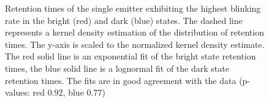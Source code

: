 	\begin{figure}[tp]
		\centering
		\caption{Retention times of the single emitter exhibiting the highest blinking rate in the bright (red) and dark (blue) states. The dashed line represents a kernel density estimation of the distribution of retention times. The y-axis is scaled to the normalized kernel density estimate. The red solid line is an exponential fit of the bright state retention times, the blue solid line is a lognormal fit of the dark state retention times. The fits are in good agreement with the data (p-values: red 0.92, blue 0.77)}
		\label{fig::fit_blink_distr}
	\end{figure}


